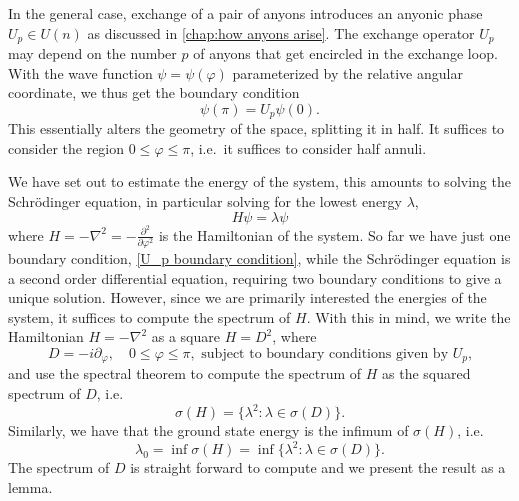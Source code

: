 In the general case, exchange of a pair of anyons introduces an anyonic phase $U_p ∈ U(n)$ as discussed in \cref{chap:how anyons arise}. The exchange operator $U_p$ may depend on the number $p$ of anyons that get encircled in the exchange loop. With the wave function $ψ = ψ(\varphi)$ parameterized by the relative angular coordinate, we thus get the boundary condition
\begin{equation}\label{U_p boundary condition}
  ψ(π) = U_p ψ(0).
\end{equation}
This essentially alters the geometry of the space, splitting it in half. It suffices to consider the region $0 \le \varphi \le π$, i.e.\ it suffices to consider half annuli.

We have set out to estimate the energy of the system, this amounts to solving the Schrödinger equation, in particular solving for the lowest energy $λ$,
\begin{equation}
  H ψ = λ ψ
\end{equation}
where $H = -∇^2 = -\frac{\partial^2}{\partial\varphi^2}$ is the Hamiltonian of the system.
So far we have just one boundary condition, \cref{U_p boundary condition}, while the Schrödinger equation is a second order differential equation, requiring two boundary conditions to give a unique solution.
However, since we are primarily interested the energies of the system, it suffices to compute the spectrum of $H$. With this in mind, we write the Hamiltonian $H = -∇^2$ as a square $H = D^2$, where
\begin{equation}
  D = -i\partial_\varphi, \quad 0 \le \varphi \le π, \text{ subject to boundary conditions given by $U_p$,}
\end{equation}
and use the spectral theorem to compute the spectrum of $H$ as the squared spectrum of $D$, i.e.
\begin{equation}
  σ(H) = \{λ^2 : λ ∈ σ(D)\}.
\end{equation}
Similarly, we have that the ground state energy is the infimum of $σ(H)$, i.e.
\begin{equation}
  λ_0 = \inf σ(H) = \inf \{λ^2 : λ ∈ σ(D)\}.
\end{equation}
The spectrum of $D$ is straight forward to compute and we present the result as a lemma.

